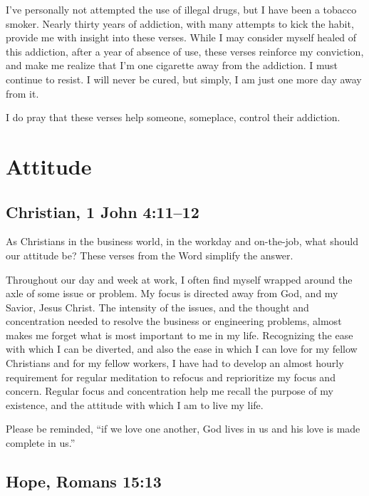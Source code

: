 \documentclass[12pt]{memoir}
\begin{document}
I've personally not attempted the use of illegal drugs, but I have
been a tobacco smoker. Nearly thirty years of addiction, with many
attempts to kick the habit, provide me with insight into these verses.
While I may consider myself healed of this addiction, after a year
of absence of use, these verses reinforce my conviction, and make
me realize that I'm one cigarette away from the addiction. I must
continue to resist. I will never be cured, but simply, I am just one
more day away from it.

I do pray that these verses help someone, someplace, control their
addiction.

\section{Attitude}

\subsection[Christian]{Christian, 1 John 4:11--12}

As Christians in the business world, in the workday and on-the-job,
what should our attitude be? These verses from the Word simplify the
answer.

Throughout our day and week at work, I often find myself wrapped
around the axle of some issue or problem.
My focus is directed
away from God, and my Savior, Jesus Christ. The intensity of the issues,
and the thought and concentration needed to resolve the business or
engineering problems, almost makes me forget what is most important
to me in my life. Recognizing the ease with which I can be diverted,
and also the ease in which I can love for my fellow Christians
and for my fellow workers, I have had to develop an almost hourly
requirement for regular meditation to refocus and reprioritize
my focus and concern. Regular focus and concentration help me
recall the purpose of my existence, and the attitude with which
I am to live my life.

Please be reminded, ``if we love one another, God lives in us and his love is made complete in us.''

\subsection[Hope]{Hope, Romans 15:13}
\end{document}
